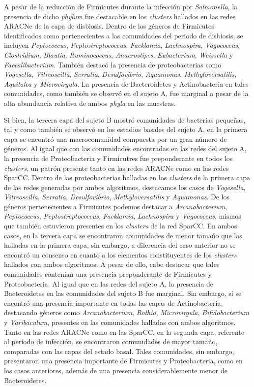 \documentclass[
]{book}
\begin{document}
A pesar de la reducción de Firmicutes durante la infección por \emph{Salmonella}, la presencia de dicho \emph{phylum} fue destacable en los \emph{clusters} hallados en las redes ARACNe de la capa de disbiosis. Dentro de los géneros de Firmicutes identificados como pertenecientes a las comunidades del periodo de disbiosis, se incluyen \emph{Peptococcus}, \emph{Peptostreptococcus}, \emph{Facklamia}, \emph{Lachnospira}, \emph{Vagococcus}, \emph{Clostridium}, \emph{Blautia}, \emph{Ruminococcus}, \emph{Anaerostipes}, \emph{Eubacterium}, \emph{Weissella} y \emph{Faecalibacterium}. También destacó la presencia de proteobacterias como \emph{Vogesella}, \emph{Vitreoscilla}, \emph{Serratia}, \emph{Desulfovibrio}, \emph{Aquamonas}, \emph{Methyloversatilis}, \emph{Aquitalea} y \emph{Microvirgula}. La presencia de Bacteroidetes y Actinobacteria en tales comunidades, como también se observó en el sujeto A, fue marginal a pesar de la alta abundancia relativa de ambos \emph{phyla} en las muestras.

Si bien, la tercera capa del sujeto B mostró comunidades de bacterias pequeñas, tal y como también se observó en los estadios basales del sujeto A, en la primera capa se encontró una macrocomunidad compuesta por un gran número de géneros. Al igual que con las comunidades encontradas en las redes del sujeto A, la presencia de Proteobacteria y Firmicutres fue preponderante en todos los \emph{clusters}, un patrón presente tanto en las redes ARACNe como en las redes SparCC. Dentro de las proteobacterias halladas en los \emph{clusters} de la primera capa de las redes generadas por ambos algoritmos, destacamos los casos de \emph{Vogesella}, \emph{Vitreoscilla}, \emph{Serratia}, \emph{Desulfovibrio}, \emph{Methyloversatilis} y \emph{Aquamonas}. De los géneros pertenecientes a Firmicutes podemos destacar a \emph{Arcanobacterium}, \emph{Peptococcus}, \emph{Peptostreptococcus}, \emph{Facklamia}, \emph{Lachnospira} y \emph{Vagococcus}, mismos que también estuvieron presentes en los \emph{clusters} de la red SparCC. En ambos casos, en la tercera capa se encontraron comunidades de menor tamaño que las halladas en la primera capa, sin embargo, a diferencia del caso anterior no se encontró un consenso en cuanto a los elementos constituyentes de los \emph{clusters} hallados con ambos algoritmos. A pesar de ello, cabe destacar que tales comunidades contenían una presencia preponderante de Firmicutes y Proteobacteria. Al igual que en las redes del sujeto A, la presencia de Bacteroidetes en las comunidades del sujeto B fue marginal. Sin embargo, sí se encontró una presencia importante en todas las capas de Actinobacteria, destacando géneros como \emph{Arcanobacterium}, \emph{Rothia}, \emph{Microvirgula}, \emph{Bifidobacterium} y \emph{Varibaculum}, presentes en las comunidades halladas con ambos algoritmos. Tanto en las redes ARACNe como en las SparCC, en la segunda capa, referente al periodo de infección, se encontraron comunidades de mayor tamaño, comparadas con las capas del estado basal. Tales comunidades, sin embargo, presentaron una presencia importante de Firmicutes y Proteobacteria, como en los casos anteriores, además de una presencia considerablemente menor de Bacteroidetes.
\end{document}
